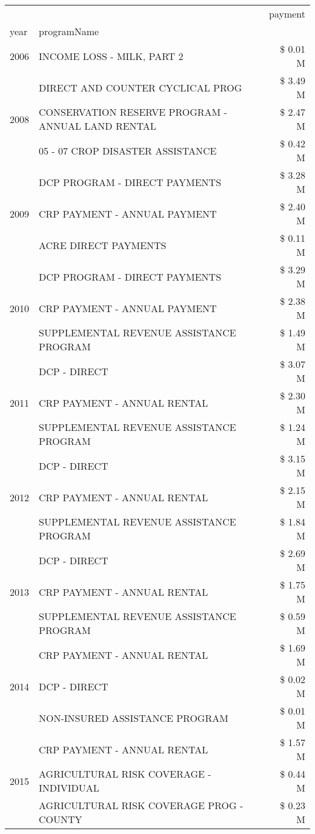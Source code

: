 \begin{tabular}{llr}
\toprule
 &  & payment \\
year & programName &  \\
\midrule
2006 & INCOME LOSS - MILK, PART 2 & \$ 0.01 M \\
\cline{1-3}
\multirow[t]{3}{*}{2008} & DIRECT AND COUNTER CYCLICAL PROG & \$ 3.49 M \\
 & CONSERVATION RESERVE PROGRAM - ANNUAL LAND RENTAL & \$ 2.47 M \\
 & 05 - 07 CROP DISASTER ASSISTANCE & \$ 0.42 M \\
\cline{1-3}
\multirow[t]{3}{*}{2009} & DCP PROGRAM - DIRECT PAYMENTS & \$ 3.28 M \\
 & CRP PAYMENT - ANNUAL PAYMENT & \$ 2.40 M \\
 & ACRE DIRECT PAYMENTS & \$ 0.11 M \\
\cline{1-3}
\multirow[t]{3}{*}{2010} & DCP PROGRAM - DIRECT PAYMENTS & \$ 3.29 M \\
 & CRP PAYMENT - ANNUAL PAYMENT & \$ 2.38 M \\
 & SUPPLEMENTAL REVENUE ASSISTANCE PROGRAM & \$ 1.49 M \\
\cline{1-3}
\multirow[t]{3}{*}{2011} & DCP - DIRECT & \$ 3.07 M \\
 & CRP PAYMENT - ANNUAL RENTAL & \$ 2.30 M \\
 & SUPPLEMENTAL REVENUE ASSISTANCE PROGRAM & \$ 1.24 M \\
\cline{1-3}
\multirow[t]{3}{*}{2012} & DCP - DIRECT & \$ 3.15 M \\
 & CRP PAYMENT - ANNUAL RENTAL & \$ 2.15 M \\
 & SUPPLEMENTAL REVENUE ASSISTANCE PROGRAM & \$ 1.84 M \\
\cline{1-3}
\multirow[t]{3}{*}{2013} & DCP - DIRECT & \$ 2.69 M \\
 & CRP PAYMENT - ANNUAL RENTAL & \$ 1.75 M \\
 & SUPPLEMENTAL REVENUE ASSISTANCE PROGRAM & \$ 0.59 M \\
\cline{1-3}
\multirow[t]{3}{*}{2014} & CRP PAYMENT - ANNUAL RENTAL & \$ 1.69 M \\
 & DCP - DIRECT & \$ 0.02 M \\
 & NON-INSURED ASSISTANCE PROGRAM & \$ 0.01 M \\
\cline{1-3}
\multirow[t]{3}{*}{2015} & CRP PAYMENT - ANNUAL RENTAL & \$ 1.57 M \\
 & AGRICULTURAL RISK COVERAGE - INDIVIDUAL & \$ 0.44 M \\
 & AGRICULTURAL RISK COVERAGE PROG - COUNTY & \$ 0.23 M \\

\end{tabular}
